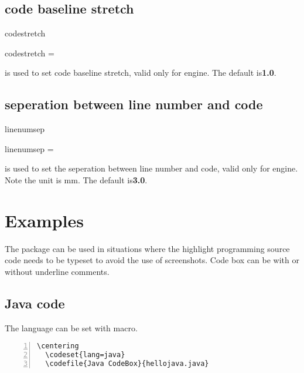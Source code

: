 \documentclass{ctxdoc-en}
\begin{document}
\subsection{code baseline stretch}

\begin{function}[added=2021-12-26,updated=2021-12-26]{codestretch}
  \begin{syntax}
    codestretch =  
  \end{syntax}
   is used to set code baseline stretch, valid only for  engine.
  The default is\textbf{1.0}.
\end{function}

\subsection{seperation between line number and code}

\begin{function}[added=2021-12-26,updated=2021-12-26]{linenumsep}
  \begin{syntax}
    linenumsep =  
  \end{syntax}
   is used to set the seperation between line number and code,
  valid only for  engine.
  Note the unit is mm.
  The default is\textbf{3.0}.
\end{function}

\section{Examples}

The  package can be used in situations
where the highlight programming source code needs to be typeset
to avoid the use of screenshots.
Code box can be with or without underline comments.

\newpage

\subsection{Java code}
The language can be set with  macro.

\begin{Verbatim}[frame=none,numbers=left,gobble=2]
  \centering
  \codeset{lang=java}
  \codefile{Java CodeBox}{hellojava.java}
\end{Verbatim}

\begin{center}
  \begin{minipage}{0.85\textwidth}
  \end{minipage}
\end{center}
\end{document}
